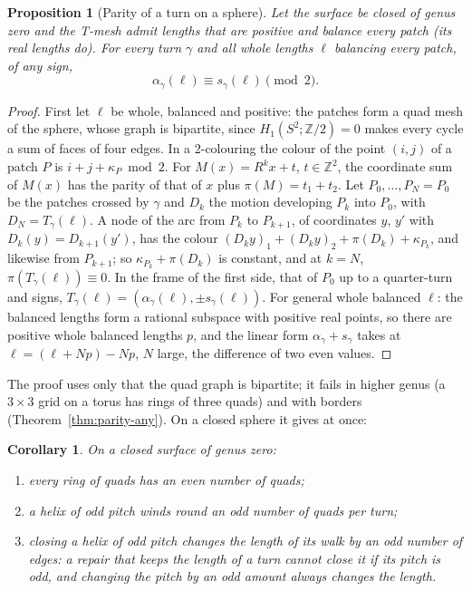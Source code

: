 \documentclass[11pt,a4paper]{article}
\newtheorem{proposition}{Proposition}
\newtheorem{corollary}{Corollary}
\newcommand{\Z}{\mathbb{Z}}
\newcommand{\shift}{s}
\begin{document}
\begin{proposition}[Parity of a turn on a sphere]\label{prop:parity}
Let the surface be closed of genus zero and the T-mesh admit lengths that are
positive and balance every patch (its real lengths do). For every turn
$\gamma$ and all whole lengths $\ell$ balancing every patch, of any sign,
\[
  \alpha_\gamma(\ell) \equiv \shift_\gamma(\ell) \pmod 2 .
\]
\end{proposition}

\begin{proof}
First let $\ell$ be whole, balanced and positive: the patches form a quad mesh
of the sphere, whose graph is bipartite, since $H_1(S^2; \Z/2) = 0$ makes
every cycle a sum of faces of four edges. In a 2-colouring the colour of the
point $(i, j)$ of a patch $P$ is $i + j + \kappa_P \bmod 2$. For $M(x) = R^k
x + t$, $t \in \Z^2$, the coordinate sum of $M(x)$ has the parity of that of
$x$ plus $\pi(M) = t_1 + t_2$. Let $P_0, \dots, P_N = P_0$ be the patches
crossed by $\gamma$ and $D_k$ the motion developing $P_k$ into $P_0$, with
$D_N = T_\gamma(\ell)$. A node of the arc from $P_k$ to $P_{k+1}$, of
coordinates $y$, $y'$ with $D_k(y) = D_{k+1}(y')$, has the colour $(D_k y)_1 +
(D_k y)_2 + \pi(D_k) + \kappa_{P_k}$, and likewise from $P_{k+1}$; so
$\kappa_{P_k} + \pi(D_k)$ is constant, and at $k = N$, $\pi(T_\gamma(\ell))
\equiv 0$. In the frame of the first side, that of $P_0$ up to a quarter-turn
and signs, $T_\gamma(\ell) = (\alpha_\gamma(\ell),
\pm\shift_\gamma(\ell))$. For general whole balanced $\ell$: the balanced
lengths form a rational subspace with positive real points, so there are
positive whole balanced lengths $p$, and the linear form $\alpha_\gamma +
\shift_\gamma$ takes at $\ell = (\ell + Np) - Np$, $N$ large, the difference
of two even values.
\end{proof}

The proof uses only that the quad graph is bipartite; it fails in higher genus
(a $3 \times 3$ grid on a torus has rings of three quads) and with borders
(Theorem~\ref{thm:parity-any}). On a closed sphere it gives at once:

\begin{corollary}\label{cor:parity}
On a closed surface of genus zero:
\begin{enumerate}
\item[(a)] every ring of quads has an even number of quads;
\item[(b)] a helix of odd pitch winds round an odd number of quads per turn;
\item[(c)] closing a helix of odd pitch changes the length of its walk by an
  odd number of edges: a repair that keeps the length of a turn cannot close it
  if its pitch is odd, and changing the pitch by an odd amount always changes
  the length.
\end{enumerate}
\end{corollary}
\end{document}
